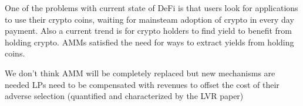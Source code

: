 \documentclass[11pt, reqno]{amsart}
\theoremstyle{definition}
\theoremstyle{remark}
\newcommand{\tA}{\textnormal{\texttt{A}}}
\newcommand{\tB}{\textnormal{\texttt{B}}}
\begin{document}
One of the problems with current state of DeFi is that users look for
applications to use their crypto coins, waiting for mainsteam adoption of
crypto in every day payment.
Also a current trend is for crypto holders to find yield to benefit from
holding crypto. AMMs satisfied the need for ways to extract yields from holding
coins.

We don't think AMM will be completely replaced but new mechanisms are needed LPs
need to be compensated with revenues to offset the cost of their adverse
selection (quantified and characterized by the LVR paper)

%
%
%
\end{document}
